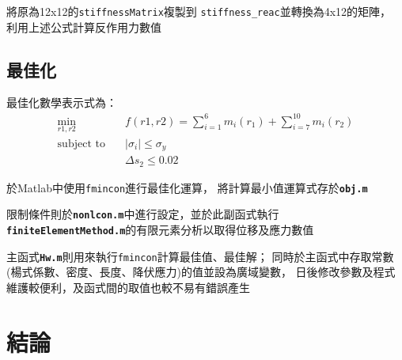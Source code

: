 \documentclass[12pt,a4paper]{article}
\begin{document}
            將原為12x12的\texttt{stiffnessMatrix}複製到
            \texttt{stiffness\_reac}並轉換為4x12的矩陣，
            利用上述公式計算反作用力數值
            
    
    \newpage
    \subsection{最佳化}

        最佳化數學表示式為：
        \begin{align*}
            \min_{r1,r2}\quad & f\left(r1,r2\right) = \sum_{i=1}^6m_i(r_1) + \sum_{i=7}^{10}m_i(r_2) \\
            \mbox{subject to}\quad & |\sigma_i| \leq \sigma_y \\
                               & \Delta s_2 \leq 0.02
        \end{align*}
        
        於Matlab中使用\texttt{fmincon}進行最佳化運算，
        將計算最小值運算式存於\textbf{\texttt{obj.m}}
        
        限制條件則於\textbf{\texttt{nonlcon.m}}中進行設定，並於此副函式執行\\
        \textbf{\texttt{finiteElementMethod.m}}的有限元素分析以取得位移及應力數值
        
        
        主函式\textbf{\texttt{Hw.m}}則用來執行\texttt{fmincon}計算最佳值、最佳解；
        同時於主函式中存取常數(楊式係數、密度、長度、降伏應力)的值並設為廣域變數，
        日後修改參數及程式維護較便利，及函式間的取值也較不易有錯誤產生
        
        


\newpage

\section{結論}
\end{document}

